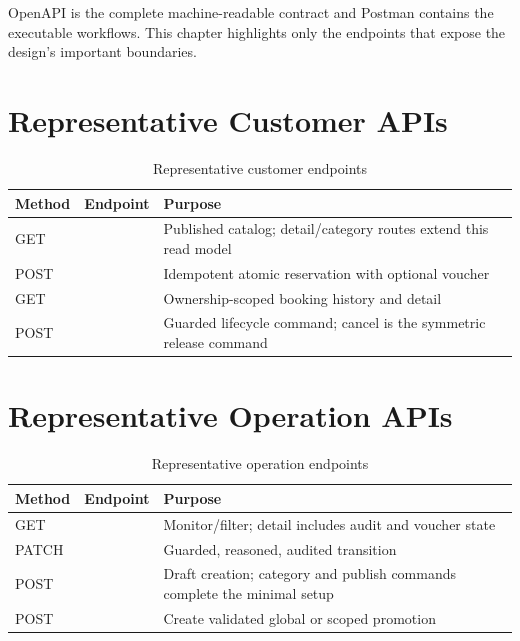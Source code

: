 OpenAPI is the complete machine-readable contract and Postman contains the
executable workflows. This chapter highlights only the endpoints that expose
the design's important boundaries.

\section{Representative Customer APIs}
\begin{table}[H]
\centering
\small
\caption{Representative customer endpoints}
\begin{tabularx}{\textwidth}{p{}p{}Y}
\toprule
\textbf{Method} & \textbf{Endpoint} & \textbf{Purpose} \\
\midrule
GET &  & Published catalog; detail/category routes extend this read model \\
POST &  & Idempotent atomic reservation with optional voucher \\
GET &  & Ownership-scoped booking history and detail \\
POST &  & Guarded lifecycle command; cancel is the symmetric release command \\
\bottomrule
\end{tabularx}
\end{table}

\section{Representative Operation APIs}
\begin{table}[H]
\centering
\small
\caption{Representative operation endpoints}
\begin{tabularx}{\textwidth}{p{}p{}Y}
\toprule
\textbf{Method} & \textbf{Endpoint} & \textbf{Purpose} \\
\midrule
GET &  & Monitor/filter; detail includes audit and voucher state \\
PATCH &  & Guarded, reasoned, audited transition \\
POST &  & Draft creation; category and publish commands complete the minimal setup \\
POST &  & Create validated global or scoped promotion \\
\bottomrule
\end{tabularx}
\end{table}

